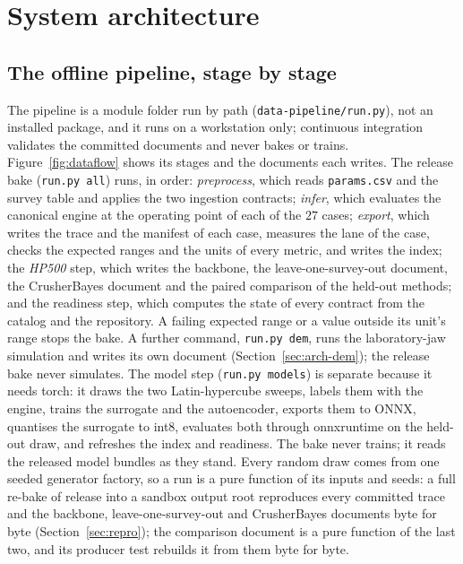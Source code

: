 \section{System architecture}\label{sec:arch}

\subsection{The offline pipeline, stage by stage}\label{sec:arch-pipeline}

The pipeline is a module folder run by path (\texttt{data-pipeline/\allowbreak{}run.py}), not an installed package, and it runs on a
workstation only; continuous integration validates the committed documents and never bakes or trains. Figure~\ref{fig:dataflow}
shows its stages and the documents each writes. The release bake (\texttt{run.py all}) runs, in order: \emph{preprocess}, which
reads \texttt{params.csv} and the survey table and applies the two ingestion contracts; \emph{infer}, which evaluates the
canonical engine at the operating point of each of the $27$ cases; \emph{export}, which writes the trace and the manifest of each
case, measures the lane of the case, checks the expected ranges and the units of every metric, and writes the index; the
\emph{HP500} step, which writes the backbone, the leave-one-survey-out document, the CrusherBayes document and the paired
comparison of the held-out methods; and the readiness
step, which computes the state of every contract from the catalog and the repository. A failing expected range or a value outside
its unit's range stops the bake. A further command, \texttt{run.py dem}, runs the laboratory-jaw simulation and writes its own document (Section~\ref{sec:arch-dem}); the release bake never simulates. The model step (\texttt{run.py models}) is separate because it needs torch: it draws the two
Latin-hypercube sweeps, labels them with the engine, trains the surrogate and the autoencoder, exports them to ONNX, quantises the
surrogate to int8, evaluates both through onnxruntime on the held-out draw, and refreshes the index and readiness. The bake never
trains; it reads the released model bundles as they stand. Every random draw comes from one seeded generator factory, so a run is
a pure function of its inputs and seeds: a full re-bake of release \docrelease{} into a sandbox output root reproduces every committed trace
and the backbone, leave-one-survey-out and CrusherBayes documents byte for byte (Section~\ref{sec:repro}); the comparison
document is a pure function of the last two, and its producer test rebuilds it from them byte for byte.

